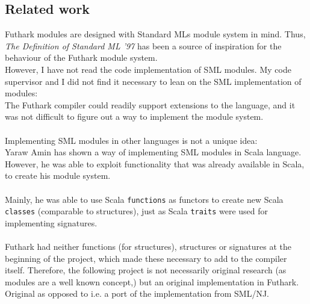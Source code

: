 \subsection{Related work}
Futhark modules are designed with Standard MLs module system in mind. Thus, 
\textit{The Definition of Standard ML '97}\cite{sml_book} has been a source of inspiration
for the behaviour of the Futhark module system. \\
However, I have not read the code implementation of SML modules. My code supervisor and I did not find it necessary to lean on the SML implementation of modules:\\
The Futhark compiler could readily support extensions to the language, and it was not difficult to
figure out a way to implement the module system.
\\
\\
Implementing SML modules in other languages is not a unique idea:\\
Yaraw Amin\cite{scala_modules} has shown a way of implementing SML modules in Scala
language. However, he was able to exploit functionality that was already available in
Scala, to create his module system.
\\
\\
Mainly, he was able to use Scala \texttt{functions} as functors to create new Scala
\texttt{classes} (comparable to structures), just as Scala
\texttt{traits} were used for implementing signatures.
\\
\\
Futhark had neither functions (for structures), structures or signatures at the
beginning of the project, which made these necessary to add to the compiler itself. Therefore, the following project is not necessarily original research (as modules are a well known concept,) but an original implementation in Futhark. Original as opposed to i.e. a port of the implementation from SML/NJ.